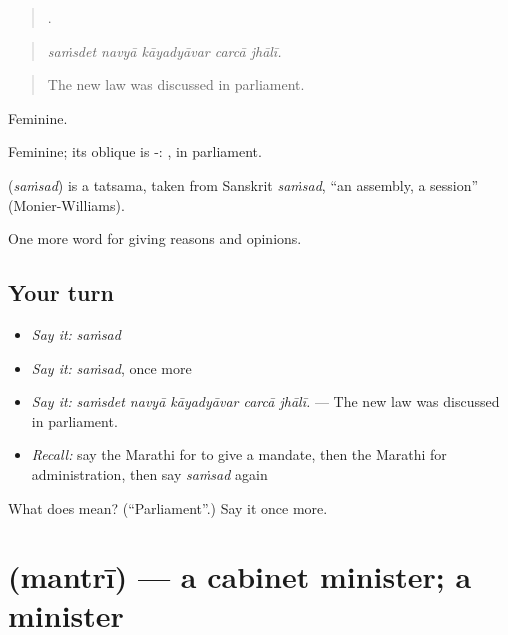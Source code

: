\begin{quote}
    .
\end{quote}

\begin{quote}
\emph{saṁsdet navyā kāyadyāvar carcā jhālī.}
\end{quote}

\begin{quote}
The new law was discussed in parliament.
\end{quote}

Feminine.

Feminine; its oblique is -: , in parliament.

\begin{cousinweb}
\textbf{} (\emph{saṁsad}) is a tatsama, taken from Sanskrit \emph{saṁsad}, \textquotedblleft{}an assembly, a session\textquotedblright{} (Monier-Williams).
\end{cousinweb}

\begin{grammarlens}[title={What you've built}]
One more word for giving reasons and opinions.
\end{grammarlens}

\subsection*{Your turn}
\begin{itemize}
\raggedright
  \item \emph{Say it:} \emph{saṁsad}
  \item \emph{Say it:} \emph{saṁsad}, once more
  \item \emph{Say it:} \emph{saṁsdet navyā kāyadyāvar carcā jhālī.} — The new law was discussed in parliament.
  \item \emph{Recall:} say the Marathi for to give a mandate, then the Marathi for administration, then say \emph{saṁsad} again
\end{itemize}

\begin{tcolorbox}[breakable,colback=teal!4,colframe=teal!35!black,title={Before you move on}]
What does  mean? (\textquotedblleft{}Parliament\textquotedblright{}.) Say it once more.
\end{tcolorbox}
\section[\texorpdfstring{\mr{मंत्री} (mantrī)}{मंत्री (mantrī)}]{ (mantrī) — a cabinet minister; a minister}

